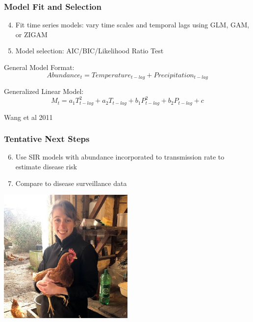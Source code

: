 \documentclass{beamer}
\begin{document}
\begin{frame}
\frametitle{Model Fit and Selection}

\begin{enumerate}
	\setcounter{enumi}{3}
	\item Fit time series models: vary time scales and temporal lags using GLM, GAM, or ZIGAM
	
	\item Model selection: AIC/BIC/Likelihood Ratio Test
	
\end{enumerate}
\vspace{0.1cm}
\small
General Model Format:
$$ Abundance_t = Temperature_{t-lag} + Precipitation_{t-lag} $$

Generalized Linear Model:
$$ M_t = a_1T_{t-lag}^2 + a_2T_{t-lag} + b_1P_{t-lag}^2 + b_2P_{t-lag} + c$$

\tiny Wang et al 2011

\end{frame}

\begin{frame}
\frametitle{Tentative Next Steps}

\begin{enumerate}
	\setcounter{enumi}{5}
	\item Use SIR models with abundance incorporated to transmission rate to estimate disease risk

\item Compare to disease surveillance data
	
\end{enumerate}
\vspace{0.7cm}

\includegraphics[width=0.5\textwidth]{chicken.jpg}

\vspace{1cm}
\end{frame}
\end{document}
